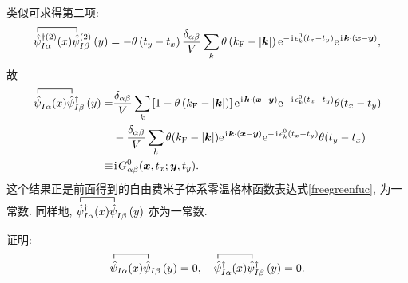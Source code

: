 类似可求得第二项:
\begin{equation}
\contraction{}{\hat{\psi}}{_{I \alpha}^{\dagger(2)}(x)}{\hat{\psi}}
\hat{\psi}_{I \alpha}^{\dagger(2)}(x) \hat{\psi}_{I \beta}^{(2)}\left(y\right)
=-\theta\left(t_y-t_x\right)\frac{\delta_{\alpha \beta}}{V} \sum_{k} \theta\left(k_{\fun F}-|\vct{k}|\right) \e^{-\ii\epsilon_{k}^{0}\left(t_x-t_y\right)} \e^{\ii\vct{k} \cdot\left(\vct{x}-\vct{y}\right)},
\end{equation}
故
\begin{align}
\contraction{}{\hat{\psi}}{^{}_{I \alpha}(x)}{\hat{\psi}}
\hat{\psi}^{}_{I \alpha}(x) \hat{\psi}_{I \beta}^{\dagger}\left(y\right) =&
\frac{\delta_{\alpha\beta}}{V}\sum_k\lmi 1-\theta\ls k_{\fun{F}}-|\vct{k}| \rs \rmi \e^{\ii\vct{k}\cdot(\vct{x}-\vct{y})}\e^{-\ii\epsilon_k^0(t_x-t_y)}\theta(t_x-t_y)\nonumber\\
        &-\frac{\delta_{\alpha\beta}}{V}\sum_k\theta(k_{\fun{F}}-|\vct{k}|) \e^{\ii\vct{k}\cdot(\vct{x}-\vct{y})}\e^{-\ii\epsilon_k^0(t_x-t_y)}\theta(t_y-t_x)\nonumber\\
\equiv&\ii G_{\alpha\beta}^{0}(\vct{x},t_x;\vct{y},t_y).
\end{align}
这个结果正是前面得到的自由费米子体系零温格林函数表达式\eqref{freegreenfuc}, 为一常数. 同样地, $\contraction{}{\hat{\psi}}{^{\dagger}_{I \alpha}(x)}{\hat{\psi}}
\hat{\psi}^{\dagger}_{I \alpha}(x) \hat{\psi}^{}_{I \beta}\left(y\right)$ 亦为一常数.

\begin{question}{}{}
证明:
\begin{equation}
\contraction{}{\hat{\psi}}{_{I \alpha}(x)}{\hat{\psi}}
\hat{\psi}_{I \alpha}(x) \hat{\psi}_{I \beta}\left(y\right)=0,\quad
\contraction{}{\hat{\psi}}{^{\dagger}_{I \alpha}(x)}{\hat{\psi}}
\hat{\psi}^{\dagger}_{I \alpha}(x) \hat{\psi}^{\dagger}_{I \beta}\left(y\right)=0.
\end{equation}
\end{question}

